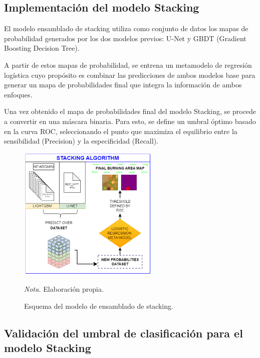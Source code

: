 \subsection{Implementación del modelo Stacking}
El modelo ensamblado de stacking utiliza como conjunto de datos los mapas de probabilidad generados por los dos modelos previos: U-Net y GBDT (Gradient Boosting Decision Tree). 

A partir de estos mapas de probabilidad, se entrena un metamodelo de regresión logística cuyo propósito es combinar las predicciones de ambos modelos base para generar un mapa de probabilidades final que integra 
la información de ambos enfoques. 

Una vez obtenido el mapa de probabilidades final del modelo Stacking, se procede a convertir en una máscara binaria. Para esto, se define un umbral óptimo basado en la curva ROC, seleccionando el 
punto que maximiza el equilibrio entre la sensibilidad (Precision) y la especificidad (Recall). 

\begin{figure}[H]
    \centering
    \caption{Esquema del modelo de ensamblado de stacking.}
    \includegraphics[width=0.6\textwidth]{img/6_metodologia/stacking.png}  
    \label{fig:stacking}
    \begin{flushleft}
        \vspace{-\baselineskip}
        \textit{Nota.} Elaboración propia.        
        \vspace{-\baselineskip}
    \end{flushleft}
 \end{figure}

\subsection{Validación del umbral de clasificación para el modelo Stacking} 
\label{sec:ajuste_umbral}

